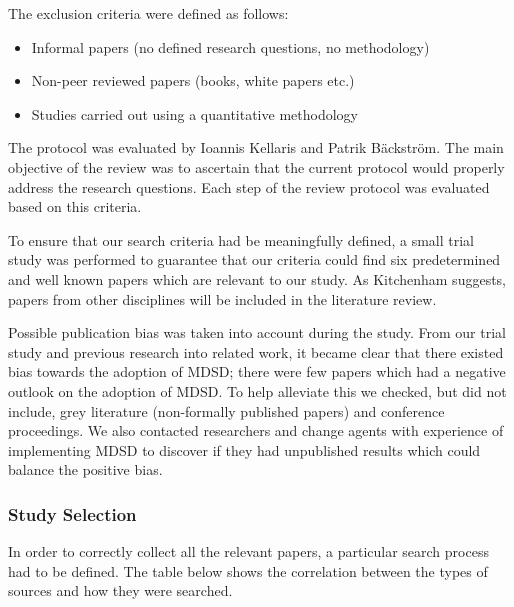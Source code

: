 \documentclass[10pt,twocolumn]{article}
\begin{document}
The exclusion criteria were defined as follows: \newline
\begin{itemize}
\item Informal papers (no defined research questions, no methodology)
\item Non-peer reviewed papers (books, white papers etc.)
\item Studies carried out using a quantitative methodology
\end{itemize} 

The protocol was evaluated by Ioannis Kellaris and Patrik B\"ackstr\"om. The main objective of the review was to ascertain that the current protocol would properly address the research questions. Each step of the review protocol was evaluated based on this criteria. 


To ensure that our search criteria had be meaningfully defined, a small trial study was performed to guarantee that our criteria could find six predetermined and well known papers which are relevant to our study. As Kitchenham \cite{kitchenham2007guidelines} suggests, papers from other disciplines will be included in the literature review. 

Possible publication bias was taken into account during the study. From our trial study and previous research into related work, it became clear that there existed bias towards the adoption of MDSD; there were few papers which had a negative outlook on the adoption of MDSD. To help alleviate this we checked, but did not include, grey literature (non-formally published papers) and conference proceedings. We also contacted researchers and change agents with experience of implementing MDSD to discover if they had unpublished results which could balance the positive bias. 

\subsubsection{Study Selection}

In order to correctly collect all the relevant papers, a particular search process had to be defined. The table below shows the correlation between the types of sources and how they were searched.
\end{document}
